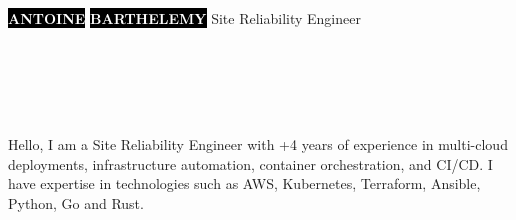 \documentclass[10pt]{developercv}
\begin{document}
\begin{minipage}[t]{0.47\textwidth}
	\vspace{-\baselineskip}
	\vspace{12pt}
	\colorbox{black}{{\HUGE\textcolor{white}{\textbf{\MakeUppercase{Antoine}}}}}
	\colorbox{black}{{\HUGE\textcolor{white}{\textbf{\MakeUppercase{Barthelemy}}}}}
	\vspace{6pt}
	{\huge Site Reliability Engineer}
\end{minipage}
\begin{minipage}[t]{0.28\textwidth}
	\vspace{-\baselineskip}
	\vspace{9pt}
	\\
	\\
	\\
	\\
\end{minipage}
\begin{minipage}[t]{0.275\textwidth}
	\vspace{-\baselineskip}
	\hspace{0.5cm}
\end{minipage}

\vspace{0.5cm}


\hspace{6pt}\begin{minipage}[t]{0.98\textwidth}
	\vspace{-\baselineskip}
	{Hello, I am a Site Reliability Engineer with +4 years of experience in multi-cloud deployments, infrastructure automation, container orchestration, and CI/CD. I have expertise in technologies such as AWS, Kubernetes, Terraform, Ansible, Python, Go and Rust.} %
\end{minipage}
\hfill

\end{document}
